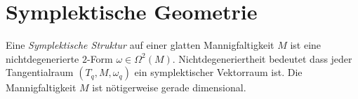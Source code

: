 \chapter{Symplektische Geometrie}
\begin{comment}
Siehe
\begin{itemize}
\item Eilenberg.pdf
\end{itemize}
TODO:
\begin{itemize}
\item symplektische Struktur
\item hamiltonsche Wirkung / Abbildung \cite[p161ff]{mcduff1998introduction}
\item momenten Abbildung \cite[p164ff]{mcduff1998introduction}
\item symplektische quotienten
\begin{itemize}
    \item \cite[Section 5.4]{mcduff1998introduction}
\end{itemize}
\end{itemize}
\textbf{Es muss Lie (teilweise) vor Symplektische Geometrie!}
\end{comment}

Eine \emph{Symplektische Struktur} auf einer glatten Mannigfaltigkeit $M$ ist
eine nichtdegenerierte $2$-Form $\omega\in\Omega^2(M)$.
Nichtdegeneriertheit bedeutet dass jeder Tangentialraum $(T_q,M,\omega_q)$ ein
symplektischer Vektorraum ist.
Die Mannigfaltigkeit $M$ ist nötigerweise gerade dimensional.
\begin{comment}
Nach \cite[Corollary 2.5]{mcduff1998introduction} gilt, dass das $n$-fache
Wedge Produkt $\omega \wedge\dots\wedge\omega$ nicht verschwindet. Damit ist
$M$ orientierbar.
\end{comment}

%
